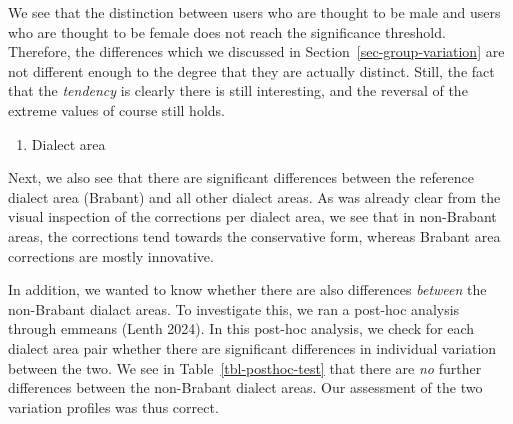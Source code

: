 \documentclass[
  letterpaper,
  DIV=11,
  numbers=noendperiod,
  oneside]{scrartcl}
\providecommand{\tightlist}{%
  \setlength{\itemsep}{0pt}\setlength{\parskip}{0pt}}\usepackage{longtable,booktabs,array}
\begin{document}
We see that the distinction between users who are thought to be male and
users who are thought to be female does not reach the significance
threshold. Therefore, the differences which we discussed in
Section~\ref{sec-group-variation} are not different enough to the degree
that they are actually distinct. Still, the fact that the
\emph{tendency} is clearly there is still interesting, and the reversal
of the extreme values of course still holds.

\begin{enumerate}
\def\labelenumi{\arabic{enumi}.}
\setcounter{enumi}{2}
\tightlist
\item
  Dialect area
\end{enumerate}

Next, we also see that there are significant differences between the
reference dialect area (Brabant) and all other dialect areas. As was
already clear from the visual inspection of the corrections per dialect
area, we see that in non-Brabant areas, the corrections tend towards the
conservative form, whereas Brabant area corrections are mostly
innovative.

In addition, we wanted to know whether there are also differences
\emph{between} the non-Brabant dialact areas. To investigate this, we
ran a post-hoc analysis through emmeans (Lenth 2024). In this post-hoc
analysis, we check for each dialect area pair whether there are
significant differences in individual variation between the two. We see
in Table~\ref{tbl-posthoc-test} that there are \emph{no} further
differences between the non-Brabant dialect areas. Our assessment of the
two variation profiles was thus correct.
\end{document}
